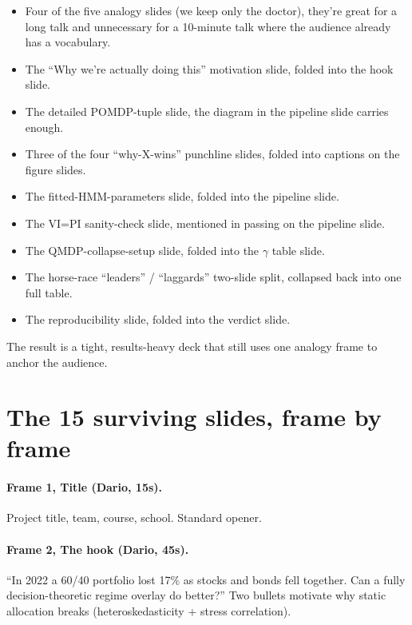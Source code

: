 \documentclass[11pt]{article}
\begin{document}
\begin{itemize}
  \item Four of the five analogy slides (we keep only the doctor), they're great for a long talk and unnecessary for a 10-minute talk where the audience already has a vocabulary.
  \item The ``Why we're actually doing this'' motivation slide, folded into the hook slide.
  \item The detailed POMDP-tuple slide, the diagram in the pipeline slide carries enough.
  \item Three of the four ``why-X-wins'' punchline slides, folded into captions on the figure slides.
  \item The fitted-HMM-parameters slide, folded into the pipeline slide.
  \item The VI=PI sanity-check slide, mentioned in passing on the pipeline slide.
  \item The QMDP-collapse-setup slide, folded into the $\gamma$ table slide.
  \item The horse-race ``leaders'' / ``laggards'' two-slide split, collapsed back into one full table.
  \item The reproducibility slide, folded into the verdict slide.
\end{itemize}

The result is a tight, results-heavy deck that still uses one analogy frame to anchor the audience.

\section{The 15 surviving slides, frame by frame}

\paragraph{Frame 1, Title (Dario, 15s).} Project title, team, course, school. Standard opener.

\paragraph{Frame 2, The hook (Dario, 45s).} ``In 2022 a 60/40 portfolio lost 17\% as stocks and bonds fell together. Can a fully decision-theoretic regime overlay do better?'' Two bullets motivate why static allocation breaks (heteroskedasticity + stress correlation).
\end{document}
